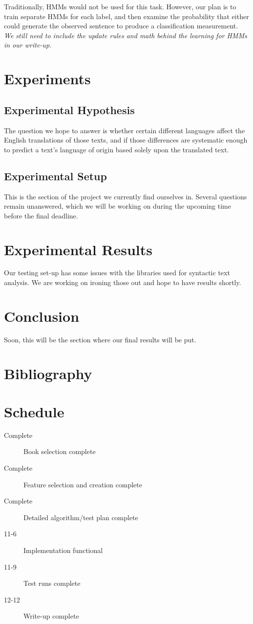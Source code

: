 \documentclass[11pt,letterpaper]{article}
\begin{document}
Traditionally, HMMs would not be used for this task.  However, our plan is to train separate HMMs for each label, and then examine the probability that either could generate the observed sentence to produce a classification measurement.\\

{\it We still need to include the update rules and math behind the learning for HMMs in our write-up.}


\section{Experiments}

\subsection{Experimental Hypothesis}
The question we hope to answer is whether certain different languages affect the English translations of those texts, and if those differences are systematic enough to predict a text’s language of origin based solely upon the translated text.

\subsection{Experimental Setup}
This is the section of the project we currently find ourselves in. Several questions remain unanswered, which we will be working on during the upcoming time before the final deadline.


\section{Experimental Results} Our testing set-up has some issues with the
libraries used for syntactic text analysis.  We are working on ironing those
out and hope to have results shortly.

\section{Conclusion}
Soon, this will be the section where our final results will be put. 

\section*{Bibliography}

\nocite{*}


\section*{Schedule}
\begin{description}
	\item[Complete] Book selection complete
	\item[Complete] Feature selection and creation complete
	\item[Complete] Detailed algorithm/test plan complete
	\item[11-6] Implementation functional
	\item[11-9] Test runs complete
	\item[12-12] Write-up complete
\end{description}
\end{document}
